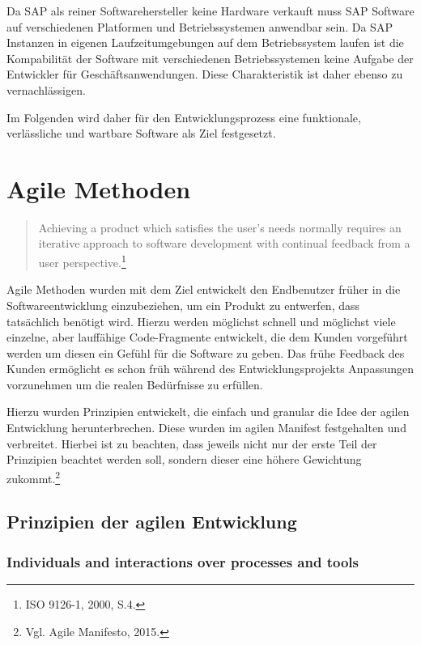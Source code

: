             Da SAP als reiner Softwarehersteller keine Hardware verkauft muss SAP Software auf verschiedenen Platformen und Betriebssystemen anwendbar sein. Da SAP Instanzen in eigenen Laufzeitumgebungen auf dem Betriebssystem laufen ist die Kompabilität der Software mit verschiedenen Betriebssystemen keine Aufgabe der Entwickler für Geschäftsanwendungen. Diese Charakteristik ist daher ebenso zu vernachlässigen.

            Im Folgenden wird daher für den Entwicklungsprozess eine funktionale, verlässliche und wartbare Software als Ziel festgesetzt.

%
%
    \section{Agile Methoden}

        \begin{quote}
          Achieving a product which satisfies the user's needs normally requires an iterative approach to software development with continual feedback from a user perspective.\footnote{ISO 9126-1, 2000, S.4.}
        \end{quote}

        Agile Methoden wurden mit dem Ziel entwickelt den Endbenutzer früher in die Softwareentwicklung einzubeziehen, um ein Produkt zu entwerfen, dass tatsächlich benötigt wird. Hierzu werden möglichst schnell und möglichst viele einzelne, aber lauffähige Code-Fragmente entwickelt, die dem Kunden vorgeführt werden um diesen ein Gefühl für die Software zu geben. Das frühe Feedback des Kunden ermöglicht es schon früh während des Entwicklungsprojekts Anpassungen vorzunehmen um die realen Bedürfnisse zu erfüllen.

        Hierzu wurden Prinzipien entwickelt, die einfach und granular die Idee der agilen Entwicklung herunterbrechen. Diese wurden im agilen Manifest festgehalten und verbreitet. Hierbei ist zu beachten, dass jeweils nicht nur der erste Teil der Prinzipien beachtet werden soll, sondern dieser eine höhere Gewichtung zukommt.\footnote{Vgl. Agile Manifesto, 2015.}

        \subsection{Prinzipien der agilen Entwicklung}

            \subsubsection{Individuals and interactions over processes and tools}

